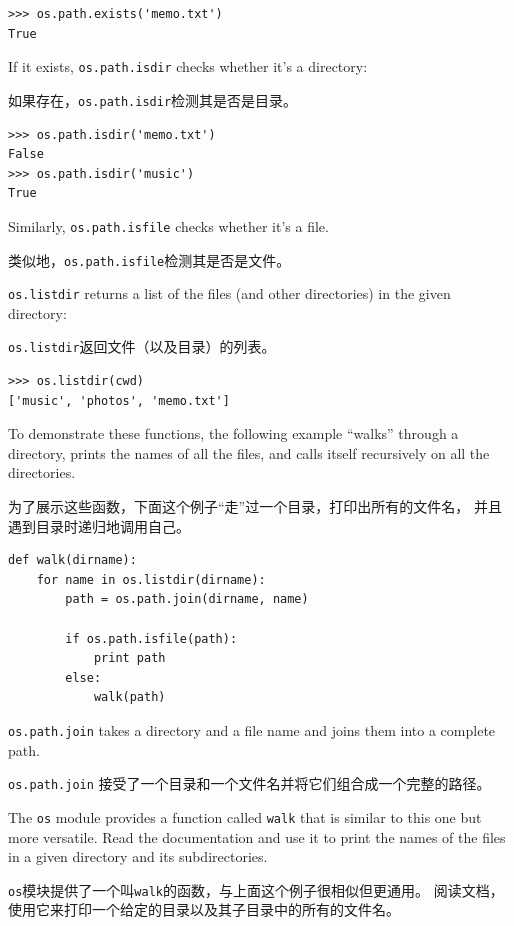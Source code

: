 \documentclass[10pt]{book}
\begin{document}
\begin{CJK}{UTF8}{gbsn}
\begin{verbatim}
>>> os.path.exists('memo.txt')
True
\end{verbatim}
%
If it exists, {\tt os.path.isdir} checks whether it's a directory:

如果存在，{\tt os.path.isdir}检测其是否是目录。

\begin{verbatim}
>>> os.path.isdir('memo.txt')
False
>>> os.path.isdir('music')
True
\end{verbatim}
%
Similarly, {\tt os.path.isfile} checks whether it's a file.

类似地，{\tt os.path.isfile}检测其是否是文件。

{\tt os.listdir} returns a list of the files (and other directories)
in the given directory:

{\tt os.listdir}返回文件（以及目录）的列表。

\begin{verbatim}
>>> os.listdir(cwd)
['music', 'photos', 'memo.txt']
\end{verbatim}
%
To demonstrate these functions, the following example
``walks'' through a directory, prints
the names of all the files, and calls itself recursively on
all the directories.

为了展示这些函数，下面这个例子``走''过一个目录，打印出所有的文件名，
并且遇到目录时递归地调用自己。

\begin{verbatim}
def walk(dirname):
    for name in os.listdir(dirname):
        path = os.path.join(dirname, name)

        if os.path.isfile(path):
            print path
        else:
            walk(path)
\end{verbatim}
%
{\tt os.path.join} takes a directory and a file name and joins
them into a complete path.  

{\tt os.path.join} 接受了一个目录和一个文件名并将它们组合成一个完整的路径。

\begin{exercise}

The {\tt os} module provides a function called {\tt walk}
that is similar to this one but more versatile.  Read
the documentation and use it to print the names of the
files in a given directory and its subdirectories.

{\tt os}模块提供了一个叫{\tt walk}的函数，与上面这个例子很相似但更通用。
阅读文档，使用它来打印一个给定的目录以及其子目录中的所有的文件名。


\end{exercise}
\end{CJK}
\end{document}

